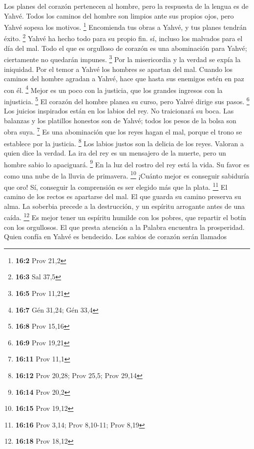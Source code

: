 \begin{paracol}{2}
 Los planes del corazón pertenecen al hombre, pero la
respuesta de la lengua es de Yahvé.  Todos los caminos del
hombre son limpios ante sus propios ojos, pero Yahvé sopesa los motivos.
\footnote{\textbf{16:2} Prov 21,2}  Encomienda tus obras a
Yahvé, y tus planes tendrán éxito. \footnote{\textbf{16:3} Sal 37,5}
 Yahvé ha hecho todo para su propio fin. sí, incluso los
malvados para el día del mal.  Todo el que es orgulloso de
corazón es una abominación para Yahvé; ciertamente no quedarán impunes.
\footnote{\textbf{16:5} Prov 11,21}  Por la misericordia y
la verdad se expía la iniquidad. Por el temor a Yahvé los hombres se
apartan del mal.  Cuando los caminos del hombre agradan a
Yahvé, hace que hasta sus enemigos estén en paz con él. \footnote{\textbf{16:7}
  Gén 31,24; Gén 33,4}  Mejor es un poco con la justicia,
que los grandes ingresos con la injusticia. \footnote{\textbf{16:8} Prov
  15,16}  El corazón del hombre planea su curso, pero
Yahvé dirige sus pasos. \footnote{\textbf{16:9} Prov 19,21}
 Los juicios inspirados están en los labios del rey. No
traicionará su boca.  Las balanzas y los platillos
honestos son de Yahvé; todos los pesos de la bolsa son obra suya.
\footnote{\textbf{16:11} Prov 11,1}  Es una abominación
que los reyes hagan el mal, porque el trono se establece por la
justicia. \footnote{\textbf{16:12} Prov 20,28; Prov 25,5; Prov 29,14}
 Los labios justos son la delicia de los reyes. Valoran a
quien dice la verdad.  La ira del rey es un mensajero de
la muerte, pero un hombre sabio lo apaciguará. \footnote{\textbf{16:14}
  Prov 20,2}  En la luz del rostro del rey está la vida.
Su favor es como una nube de la lluvia de primavera. \footnote{\textbf{16:15}
  Prov 19,12}  ¡Cuánto mejor es conseguir sabiduría que
oro! Sí, conseguir la comprensión es ser elegido más que la plata.
\footnote{\textbf{16:16} Prov 3,14; Prov 8,10-11; Prov 8,19}
 El camino de los rectos es apartarse del mal. El que
guarda su camino preserva su alma.  La soberbia precede a
la destrucción, y un espíritu arrogante antes de una caída. \footnote{\textbf{16:18}
  Prov 18,12}  Es mejor tener un espíritu humilde con los
pobres, que repartir el botín con los orgullosos.  El que
presta atención a la Palabra encuentra la prosperidad. Quien confía en
Yahvé es bendecido.  Los sabios de corazón serán llamados

\end{paracol}
